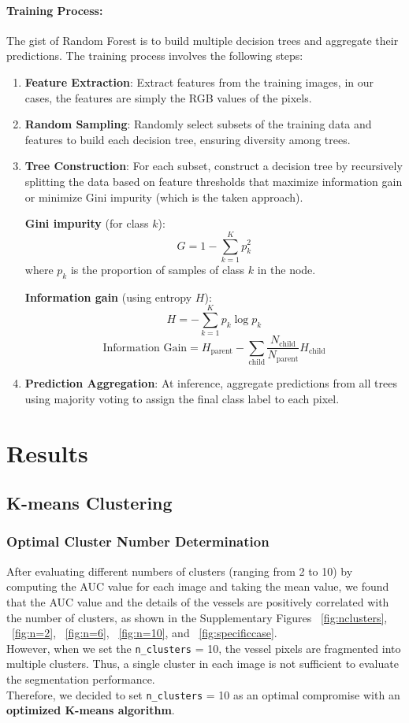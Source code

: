\documentclass[final]{article}
\begin{document}
\paragraph{Training Process:} The gist of Random Forest is to build multiple decision trees and aggregate their predictions. The training process involves the following steps: 
\begin{enumerate}
    \item \textbf{Feature Extraction}: Extract features from the training images, in our cases, the features are simply the RGB values of the pixels.
    \item \textbf{Random Sampling}: Randomly select subsets of the training data and features to build each decision tree, ensuring diversity among trees.
    \item \textbf{Tree Construction}: For each subset, construct a decision tree by recursively splitting the data based on feature thresholds that maximize information gain or minimize Gini impurity (which is the taken approach).
    
\textbf{Gini impurity} (for class \( k \)):  
\[
G = 1 - \sum_{k=1}^K p_k^2
\]  
where \( p_k \) is the proportion of samples of class \( k \) in the node.  

\textbf{Information gain} (using entropy \( H \)):  
\[
H = -\sum_{k=1}^K p_k \log p_k
\]  
\[
\text{Information Gain} = H_{\text{parent}} - \sum_{\text{child}} \frac{N_{\text{child}}}{N_{\text{parent}}} H_{\text{child}}
\]  

    \item \textbf{Prediction Aggregation}: At inference, aggregate predictions from all trees using majority voting to assign the final class label to each pixel.
\end{enumerate}


\section{Results}
\subsection{K-means Clustering}
\subsubsection{Optimal Cluster Number Determination}
After evaluating different numbers of clusters (ranging from 2 to 10) by computing the AUC value for each image and taking the mean value, we found that the AUC value and the details of the vessels are positively correlated with the number of clusters, as shown in the Supplementary Figures ~\ref{fig:nclusters}, ~\ref{fig:n=2}, ~\ref{fig:n=6}, ~\ref{fig:n=10}, and ~\ref{fig:specificcase}. \\
However, when we set the \texttt{n\_clusters} = 10, the vessel pixels are fragmented into multiple clusters. Thus, a single cluster in each image is not sufficient to evaluate the segmentation performance. \\
Therefore, we decided to set \texttt{n\_clusters} = 10 as an optimal compromise with an \textbf{optimized K-means algorithm}.
\end{document}
